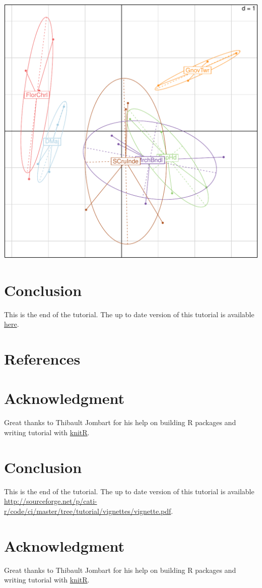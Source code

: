 \documentclass[12pt]{article}\usepackage[]{graphicx}\usepackage[]{color}
\makeatletter
\def\maxwidth{ %
  \ifdim\Gin@nat@width>\linewidth
    \linewidth
  \else
    \Gin@nat@width
  \fi
}
\newenvironment{knitrout}{}{} %
\makeatother
\begin{document}
\begin{knitrout}
\includegraphics[width=\maxwidth]{figure/unnamed-chunk-695} 

\end{knitrout}

\section*{Conclusion}
This is the end of the tutorial. The up to date version of this tutorial is available \href{http://sourceforge.net/p/cati-r/code/ci/master/tree/tutorial/vignettes/vignette.pdf}{here}.

\section*{References}

\section*{Acknowledgment}
Great thanks to Thibault Jombart for his help on building R packages and writing tutorial with \href{http://yihui.name/knitr/}{knitR}.



\section{Conclusion}
This is the end of the tutorial. The up to date version of this tutorial is available \href{here}{http://sourceforge.net/p/cati-r/code/ci/master/tree/tutorial/vignettes/vignette.pdf}.


\section{Acknowledgment}
Great thanks to Thibault Jombart for his help on building R packages and writing tutorial with \href{http://yihui.name/knitr/}{knitR}.
\end{document}

